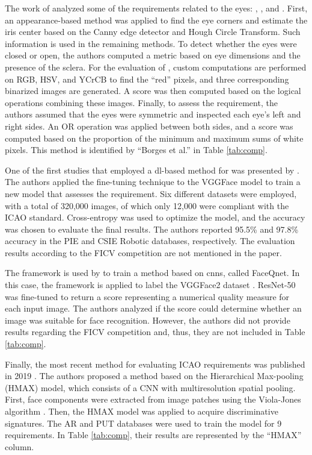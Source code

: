 The work of \citet{borges2016analysis} analyzed some of the requirements related to the eyes: \eyesclosed, \redeyes, and \lookingaway. First, an appearance-based method was applied to find the eye corners and estimate the iris center based on the Canny edge detector and Hough Circle Transform. Such information is used in the remaining methods. To detect whether the eyes were closed or open, the authors computed a metric based on eye dimensions and the presence of the sclera. For the evaluation of \redeyes, custom computations are performed on RGB, HSV, and YCrCB to find the ``red'' pixels, and three corresponding binarized images are generated. A score was then computed based on the logical operations combining these images. Finally, to assess the \lookingaway requirement, the authors assumed that the eyes were symmetric and inspected each eye's left and right sides. An OR operation was applied between both sides, and a score was computed based on the proportion of the minimum and maximum sums of white pixels. This method is identified by ``Borges et al.'' in Table \ref{tab:comp}.
 
One of the first studies that employed a \acl{dl}-based method for \icao was presented by \cite{ahmadvand2018estimating}. The authors applied the fine-tuning technique to the VGGFace model \citep{simonyan2014very} to train a new model that assesses the \rollpitchyaw requirement. Six different datasets were employed, with a total of 320,000 images, of which only 12,000 were compliant with the ICAO standard. Cross-entropy was used to optimize the model, and the accuracy was chosen to evaluate the final results. The authors reported 95.5\% and 97.8\% accuracy in the PIE \citep{sim2002cmu} and CSIE Robotic \citep{csie2006database} databases, respectively. The evaluation results according to the FICV competition are not mentioned in the paper.
 
The \biolabicao framework is used by \cite{hernandez2019faceqnet} to train a method based on \aclp{cnn}, called FaceQnet. In this case, the framework is applied to label the VGGFace2 dataset \citep{cao2018vggface2}. ResNet-50 \citep{he2016deep} was fine-tuned to return a score representing a numerical quality measure for each input image. The authors analyzed if the score could determine whether an image was suitable for face recognition. However, the authors did not provide results regarding the FICV competition and, thus, they are not included in Table \ref{tab:comp}.
 
Finally, the most recent method for evaluating ICAO requirements was published in 2019 \citep{nourbakhshfacial}. The authors proposed a method based on the Hierarchical Max-pooling (HMAX) model, which consists of a CNN with multiresolution spatial pooling. First, face components were extracted from image patches using the Viola-Jones algorithm \citep{viola2001rapid}. Then, the HMAX model was applied to acquire discriminative signatures. The AR \citep{martinez1998ar} and PUT \citep{kasinski2008put} databases were used to train the model for 9 requirements. In Table \ref{tab:comp}, their results are represented by the ``HMAX'' column.
 
